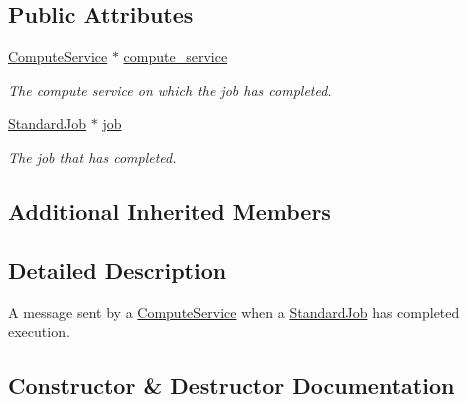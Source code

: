 \subsection*{Public Attributes}
\begin{DoxyCompactItemize}
\item 
\mbox{\label{classwrench_1_1_compute_service_standard_job_done_message_a818933b27b4c7d444928fdfa3e54b9f3}} 
\hyperlink{classwrench_1_1_compute_service}{Compute\+Service} $\ast$ \hyperlink{classwrench_1_1_compute_service_standard_job_done_message_a818933b27b4c7d444928fdfa3e54b9f3}{compute\+\_\+service}
\begin{DoxyCompactList}\small\item\em The compute service on which the job has completed. \end{DoxyCompactList}\item 
\mbox{\label{classwrench_1_1_compute_service_standard_job_done_message_aaf6ad1db0f07269049055fd542584d01}} 
\hyperlink{classwrench_1_1_standard_job}{Standard\+Job} $\ast$ \hyperlink{classwrench_1_1_compute_service_standard_job_done_message_aaf6ad1db0f07269049055fd542584d01}{job}
\begin{DoxyCompactList}\small\item\em The job that has completed. \end{DoxyCompactList}\end{DoxyCompactItemize}
\subsection*{Additional Inherited Members}


\subsection{Detailed Description}
A message sent by a \hyperlink{classwrench_1_1_compute_service}{Compute\+Service} when a \hyperlink{classwrench_1_1_standard_job}{Standard\+Job} has completed execution. 

\subsection{Constructor \& Destructor Documentation}
\mbox{\label{classwrench_1_1_compute_service_standard_job_done_message_ad61a199556e2913460e158e2ac55bb9d}} 
